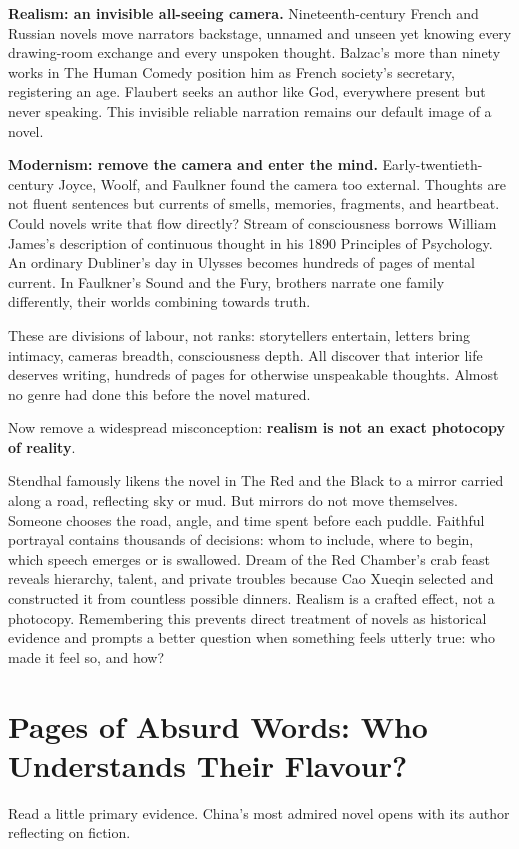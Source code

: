 \textbf{Realism: an invisible all-seeing camera.} Nineteenth-century French and Russian novels move narrators backstage, unnamed and unseen yet knowing every drawing-room exchange and every unspoken thought. Balzac's more than ninety works in The Human Comedy position him as French society's secretary, registering an age. Flaubert seeks an author like God, everywhere present but never speaking. This invisible reliable narration remains our default image of a novel.

\textbf{Modernism: remove the camera and enter the mind.} Early-twentieth-century Joyce, Woolf, and Faulkner found the camera too external. Thoughts are not fluent sentences but currents of smells, memories, fragments, and heartbeat. Could novels write that flow directly? Stream of consciousness borrows William James's description of continuous thought in his 1890 Principles of Psychology. An ordinary Dubliner's day in Ulysses becomes hundreds of pages of mental current. In Faulkner's Sound and the Fury, brothers narrate one family differently, their worlds combining towards truth.

These are divisions of labour, not ranks: storytellers entertain, letters bring intimacy, cameras breadth, consciousness depth. All discover that interior life deserves writing, hundreds of pages for otherwise unspeakable thoughts. Almost no genre had done this before the novel matured.

Now remove a widespread misconception: \textbf{realism is not an exact photocopy of reality}.

Stendhal famously likens the novel in The Red and the Black to a mirror carried along a road, reflecting sky or mud. But mirrors do not move themselves. Someone chooses the road, angle, and time spent before each puddle. Faithful portrayal contains thousands of decisions: whom to include, where to begin, which speech emerges or is swallowed. Dream of the Red Chamber's crab feast reveals hierarchy, talent, and private troubles because Cao Xueqin selected and constructed it from countless possible dinners. Realism is a crafted effect, not a photocopy. Remembering this prevents direct treatment of novels as historical evidence and prompts a better question when something feels utterly true: who made it feel so, and how?

\section[Who Understands These Absurd Words?]{Pages of Absurd Words: Who Understands Their Flavour?}
Read a little primary evidence. China's most admired novel opens with its author reflecting on fiction.

